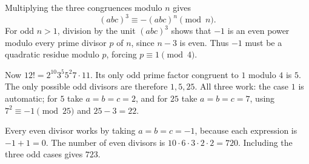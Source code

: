 Multiplying the three congruences modulo $n$ gives
\[
(abc)^3\equiv-(abc)^n\pmod n.
\]
For odd $n>1$, division by the unit $(abc)^3$ shows that $-1$ is an even power modulo every prime divisor $p$ of $n$, since $n-3$ is even. Thus $-1$ must be a quadratic residue modulo $p$, forcing $p\equiv1\pmod4$.

Now $12!=2^{10}3^5 5^2 7\cdot11$. Its only odd prime factor congruent to $1$ modulo $4$ is $5$. The only possible odd divisors are therefore $1,5,25$. All three work: the case $1$ is automatic; for $5$ take $a=b=c=2$, and for $25$ take $a=b=c=7$, using $7^2\equiv-1\pmod{25}$ and $25-3=22$.

Every even divisor works by taking $a=b=c=-1$, because each expression is $-1+1=0$. The number of even divisors is $10\cdot6\cdot3\cdot2\cdot2=720$. Including the three odd cases gives $\boxed{723}$.
